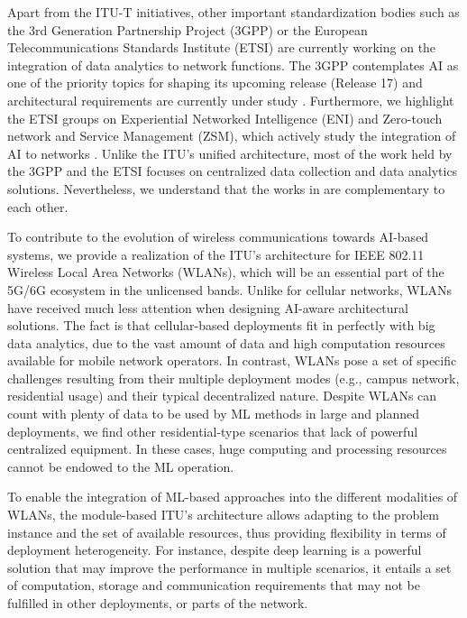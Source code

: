 \documentclass[journal]{IEEEtran}
\begin{document}
Apart from the ITU-T initiatives, other important standardization bodies such as the 3rd Generation Partnership Project (3GPP) or the European Telecommunications Standards Institute (ETSI) are currently working on the integration of data analytics to network functions. The 3GPP contemplates AI as one of the priority topics for shaping its upcoming release (Release 17) and architectural requirements are currently under study \cite{3gpp2019study}. Furthermore, we highlight the ETSI groups on Experiential Networked Intelligence (ENI) and Zero-touch network and Service Management (ZSM), which actively study the integration of AI to networks \cite{etsi2019architecture}. Unlike the ITU's unified architecture, most of the work held by the 3GPP and the ETSI focuses on centralized data collection and data analytics solutions. Nevertheless, we understand that the works in \cite{itu2019architecture, 3gpp2019study, etsi2019architecture} are complementary to each other.

To contribute to the evolution of wireless communications towards AI-based systems, we provide a realization of the ITU's architecture for IEEE 802.11 Wireless Local Area Networks (WLANs), which will be an essential part of the 5G/6G ecosystem in the unlicensed bands. Unlike for cellular networks, WLANs have received much less attention when designing AI-aware architectural solutions. The fact is that cellular-based deployments fit in perfectly with big data analytics, due to the vast amount of data and high computation resources available for mobile network operators. In contrast, WLANs pose a set of specific challenges resulting from their multiple deployment modes (e.g., campus network, residential usage) and their typical decentralized nature. Despite WLANs can count with plenty of data to be used by ML methods in large and planned deployments, we find other residential-type scenarios that lack of powerful centralized equipment. In these cases, huge computing and processing resources cannot be endowed to the ML operation. 

To enable the integration of ML-based approaches into the different modalities of WLANs, the module-based ITU's architecture allows adapting to the problem instance and the set of available resources, thus providing flexibility in terms of deployment heterogeneity. For instance, despite deep learning is a powerful solution that may improve the performance in multiple scenarios, it entails a set of computation, storage and communication requirements that may not be fulfilled in other deployments, or parts of the network.
\end{document}
